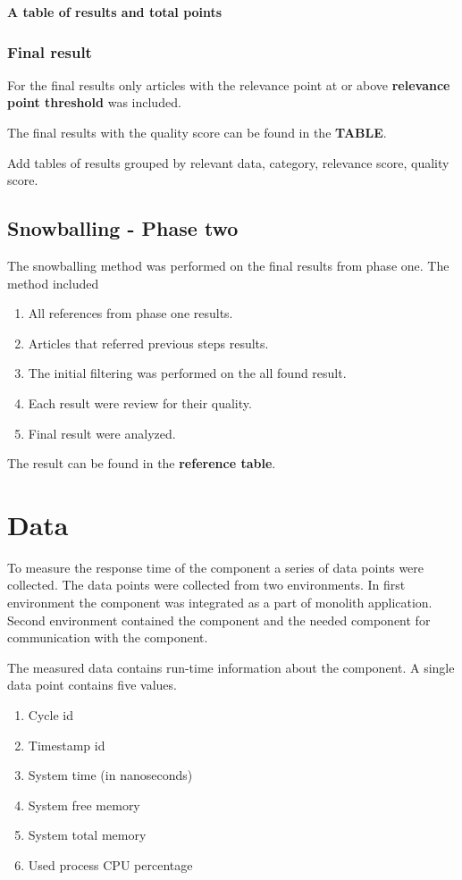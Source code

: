 \textbf{A table of results and total points}

\subsubsection{Final result}
For the final results only articles with the relevance point at or above \textbf{relevance point threshold} was included.

The final results with the quality score can be found in the \textbf{TABLE}.

Add tables of results grouped by relevant data, category, relevance score, quality score.

\subsection{Snowballing - Phase two}
The snowballing method was performed on the final results from phase one.
The method included 
\begin{enumerate}
    \item All references from phase one results.
    \item Articles that referred previous steps results.
    \item The initial filtering was performed on the all found result.
    \item Each result were review for their quality.
    \item Final result were analyzed. 
\end{enumerate}

The result can be found in the \textbf{reference table}.

\section{Data}
To measure the response time of the component a series of data points were collected.
The data points were collected from two environments.
In first environment the component was integrated as a part of monolith application.
Second environment contained the component and the needed component for communication with the component.

The measured data contains run-time information about the component.
A single data point contains five values.
\begin{enumerate}
    \item Cycle id
    \item Timestamp id
    \item System time (in nanoseconds)
    \item System free memory
    \item System total memory
    \item Used process CPU percentage
\end{enumerate}

